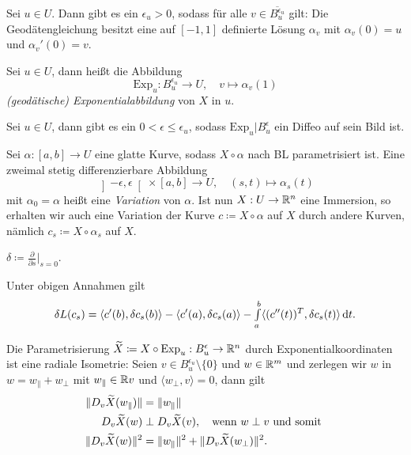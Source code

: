 \documentclass{cheat-sheet}
\newcommand{\Exp}{\mathrm{Exp}} %
\newcommand{\ointervall}[1]{\left]#1\right[} %
\begin{document}
\begin{satz}
  Sei $u \in U$. Dann gibt es ein $\epsilon_u > 0$, sodass für alle $v \in \overline{B_u^{\epsilon_u}}$ gilt: Die Geodätengleichung besitzt eine auf $[-1,1]$ definierte Lösung $\alpha_v$ mit $\alpha_v(0) = u$ und $\alpha_v'(0) = v$.
\end{satz}

\begin{defn}
  Sei $u \in U$, dann heißt die Abbildung
  \[ \Exp_u : B_u^{\epsilon_u} \to U, \quad v \mapsto \alpha_v(1) \]
  \emph{(geodätische) Exponentialabbildung} von $X$ in $u$.
\end{defn}

\begin{defn}
  Sei $u \in U$, dann gibt es ein $0 < \epsilon \leq \epsilon_u$, sodass $\Exp_u|B_u^\epsilon$ ein Diffeo auf sein Bild ist.
\end{defn}


\begin{defn}
  Sei $\alpha : [a, b] \to U$ eine glatte Kurve, sodass $X \circ \alpha$ nach BL parametrisiert ist. Eine zweimal stetig differenzierbare Abbildung
  \[ \ointervall{-\epsilon, \epsilon} \times [a, b] \to U, \quad (s, t) \mapsto \alpha_s(t) \]
  mit $\alpha_0 = \alpha$ heißt eine \emph{Variation} von $\alpha$. Ist nun $X : U \to \mathbb{R}^n$ eine Immersion, so erhalten wir auch eine Variation der Kurve $c \coloneqq X \circ \alpha$ auf $X$ durch andere Kurven, nämlich $c_s \coloneqq X \circ \alpha_s$ auf $X$.
\end{defn}

\begin{nota}
  $\delta \coloneqq \tfrac{\partial}{\partial s}|_{s=0}$.
\end{nota}

\begin{satz}
  Unter obigen Annahmen gilt
  \[ \delta L(c_s) = \langle c'(b), \delta c_s(b) \rangle - \langle c'(a), \delta c_s(a) \rangle - {\textstyle \int\limits_{a}^{b}} \langle (c''(t))^T, \delta c_s(t) \rangle \,\mathrm{d} t. \]
\end{satz}

\begin{satz}[Gaußlemma]
  Die Parametrisierung $\widetilde{X} \coloneqq X \circ \Exp_u : B_u^\epsilon \to \R^n$ durch Exponentialkoordinaten ist eine radiale Isometrie: Seien $v \in B_u^{\epsilon_u} \setminus \{0\}$ und $w \in \mathbb{R}^m$ und zerlegen wir $w$ in $w = w_{\|} + w_\perp$ mit $w_{\|} \in \mathbb{R} v$ und $\langle w_\perp, v \rangle = 0$, dann gilt
  \begin{align*}
    \lVert D_v \widetilde{X}(w_{\|})\rVert &= \lVert w_{\|}\rVert\\
    D_v \widetilde{X}(w) &\perp D_v \widetilde{X}(v), \quad \text{wenn $w \perp v$  und somit }\\
    \lVert D_v \widetilde{X}(w)\rVert^2 &= \lVert w_{\|}\rVert^2 + \lVert D_v \widetilde{X}(w_{\perp})\rVert^2.
  \end{align*}
\end{satz}
\end{document}
